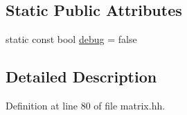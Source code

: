 \subsection*{Static Public Attributes}
\begin{DoxyCompactItemize}
\item 
static const bool \hyperlink{class_rfold_1_1_matrix_ad9a9131f0d234138b757dbe76fe62b28}{debug} = false
\end{DoxyCompactItemize}


\subsection{Detailed Description}


Definition at line 80 of file matrix.\+hh.



